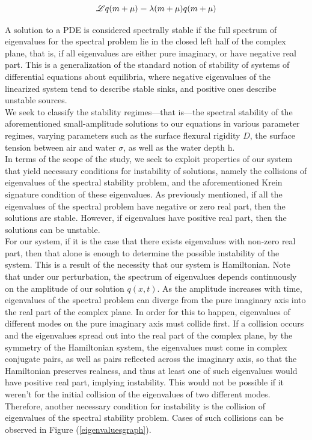 \documentclass{article}
\begin{document}
 \begin{equation} \label{eq1}
  \mathscr{L}q(m+\mu) =   \lambda(m+\mu) q(m+\mu)
   \\
\end{equation}

A solution to a PDE is considered spectrally stable if the full spectrum of eigenvalues for the spectral problem lie in the closed left half of the complex plane, that is, if all eigenvalues are either pure imaginary, or have negative real part. This is a generalization of the standard notion of stability of systems of differential equations about equilibria, where negative eigenvalues of the linearized system tend to describe stable sinks, and positive ones describe unstable sources. \\



We seek to classify the stability regimes—that is—the spectral stability of the aforementioned small-amplitude solutions to our equations in various parameter regimes, varying parameters such as the surface flexural rigidity \(D\), the surface tension between air and water \(\sigma\), as well as the water depth h. \\

In terms of the scope of the study, we seek to exploit properties of our system that yield necessary conditions for instability of solutions, namely the collisions of eigenvalues of the spectral stability problem, and the aforementioned Krein signature condition of these eigenvalues. As previously mentioned, if all the eigenvalues of the spectral problem have negative or zero real part, then the solutions are stable. However, if eigenvalues have positive real part, then the solutions can be unstable.\\

For our system, if it is the case that there exists eigenvalues with non-zero real part, then that alone is enough to determine the possible instability of the system. This is a result of the necessity that our system is Hamiltonian. Note that under our perturbation, the spectrum of eigenvalues depends continuously on the amplitude of our solution \(q(x,t)\). As the amplitude increases with time, eigenvalues of the spectral problem can diverge from the pure imaginary axis into the real part of the complex plane. In order for this to happen, eigenvalues of different modes on the pure imaginary axis must collide first. If a collision occurs and the eigenvalues spread out into the real part of the complex plane, by the symmetry of the Hamiltonian system, the eigenvalues must come in complex conjugate pairs, as well as pairs reflected across the imaginary axis, so that the Hamiltonian preserves realness, and thus at least one of such eigenvalues would have positive real part, implying instability. This would not be possible if it weren't for the initial collision of the eigenvalues of two different modes. Therefore, another necessary condition for instability is the collision of eigenvalues of the spectral stability problem. Cases of such collisions can be observed in Figure (\ref{eigenvaluesgraph}). \\
\end{document}
